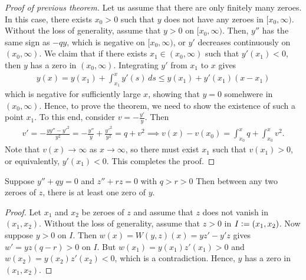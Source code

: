 \begin{proof}[Proof of previous theorem]
    Let us assume that there are only finitely many zeroes. In this case, there exists $x_{0} > 0$ such that $y$ does not have any zeroes in $[x_{0},\infty)$. Without the loss of generality, assume that $y > 0$ on $[x_{0},\infty)$. Then, $y''$ has the same sign as $-q y$, which is negative on $[x_{0},\infty)$, or $y'$ decreases continuously on $(x_{0},\infty)$. We claim that if there exists $x_{1} \in (x_{0},\infty)$ such that $y'(x_{1}) < 0$, then $y$ has a zero in $(x_{0},\infty)$. Integrating $y'$ from $x_{1}$ to $x$ gives
    \begin{align}
        y(x) = y(x_{1}) + \int_{x_{1}}^{x} y'(s) \, ds \leq y(x_{1}) + y'(x_{1})(x-x_{1})
    \end{align}
    which is negative for sufficiently large $x$, showing that $y = 0$ somehwere in $(x_{0},\infty)$. Hence, to prove the theorem, we need to show the existence of such a point $x_{1}$. To this end, consider $v = -\frac{y'}{y}$. Then
    \begin{align}
        v' = -\frac{yy''-y'^{2}}{y^{2}} = -\frac{y''}{y} + \frac{y'^{2}}{y^{2}} = q + v^{2} \implies v(x)-v(x_{0}) = \int_{x_{0}}^{x} q + \int_{x_{0}}^{x} v^{2}.
    \end{align}
    Note that $v(x) \to \infty$ as $x \to \infty$, so there must exist $x_{1}$ such that $v(x_{1}) > 0$, or equivalently, $y'(x_{1}) < 0$. This completes the proof.
\end{proof}

\begin{theorem}
    Suppose $y'' + qy = 0$ and $z'' + rz = 0$ with $q > r > 0$ Then between any two zeroes of $z$, there is at least one zero of $y$.
\end{theorem}

\begin{proof}
    Let $x_{1}$ and $x_{2}$ be zeroes of $z$ and assume that $z$ does not vanish in $(x_{1},x_{2})$. Without the loss of generality, assume that $z > 0$ in $I \vcentcolon= (x_{1},x_{2})$. Now suppose $y > 0$ on $I$. Then $w(x) = W(y,z)(x) = yz' - y'z$ gives $w' = yz(q-r) > 0$ on $I$. But $w(x_{1}) = y(x_{1})z'(x_{1}) > 0$ and $w(x_{2}) = y(x_{2})z'(x_{2}) < 0$, which is a contradiction. Hence, $y$ has a zero in $(x_{1},x_{2})$.
\end{proof}

